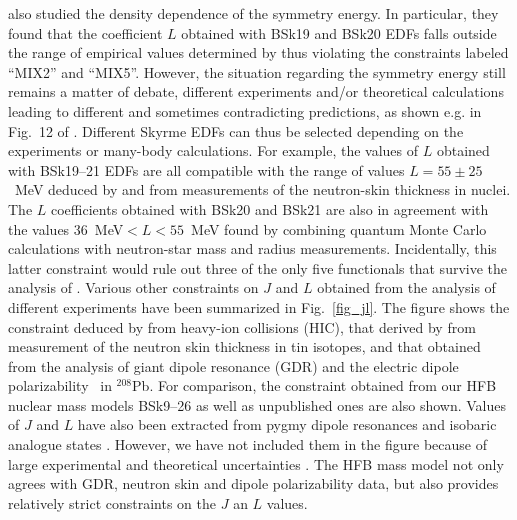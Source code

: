 \documentclass{aa}
\begin{document}
\citet{dutra2012} also studied the density dependence of the symmetry energy. 
In particular, they found that the coefficient $L$ obtained
with BSk19 and BSk20 EDFs falls 
outside the range of empirical values determined by
\citet{chen2010} thus violating the constraints labeled
``MIX2'' and ``MIX5''. However, the situation 
regarding the symmetry energy still remains a matter of debate, different 
experiments and/or theoretical calculations leading to different and 
sometimes contradicting predictions, as shown e.g. in Fig.~12 of 
\citet{lattimer2012} \citep[see also][Sect.~IIIB]{tsang2012, Goriely-ea10}. 
Different Skyrme EDFs can thus be selected depending on the experiments or 
many-body calculations. For example, the values of $L$
obtained with BSk19--21 EDFs 
are all compatible with the range of values $L=55\pm25$~MeV deduced by 
\citet{centelles2009} and \citet{warda2009} from measurements of the 
neutron-skin thickness in nuclei. The $L$ coefficients obtained with BSk20 and 
BSk21 are also in agreement with the values $36$~MeV$< L < 55$~MeV found by 
\citet{steinergandolfi2012} combining quantum Monte Carlo calculations with 
neutron-star mass and radius measurements. Incidentally, this latter constraint
would rule out three of the only five functionals that survive the analysis
of \citet{dutra2012}. Various other constraints on $J$ and
$L$ obtained from the analysis 
of different experiments \citep{tsang2012,lattimerlim2013}
have been summarized in Fig.~\ref{fig_jl}.
The figure shows the constraint deduced by \citet{tsang2009} from heavy-ion collisions 
(HIC), that derived by \citet{chen2010} from measurement of the neutron skin thickness in 
tin isotopes,  and that obtained from the analysis of giant dipole resonance (GDR) 
\citep{trippa2008, lattimerlim2013} and the electric dipole polarizability~\citep{piekarewicz2012} 
in $^{208}$Pb. For comparison, the constraint obtained from
our HFB nuclear mass models BSk9--26
 \citep[][and references therein]{Goriely-ea13,Pearson2009}
as well as unpublished ones are also shown. Values of $J$ and $L$ have also been extracted from 
pygmy dipole resonances \citep{carbone2010} and isobaric analogue states \citep{danielewiczlee2009}. 
However, we have not included them in the figure because of large experimental and theoretical 
uncertainties \citep[see, e.g.,][]{reinhardnazarewicz2010, daoutidisgoriely2011}. The 
HFB mass model not only agrees with GDR, neutron skin and dipole polarizability data, but also 
provides relatively strict constraints on the $J$ an $L$ values.
\end{document}
